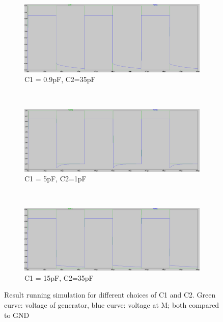 \documentclass[journal]{IEEEtran}
\begin{document}
\begin{figure}
	\begin{subfigure}[b]{\columnwidth}
		\centering
		\includegraphics[width=\textwidth]{img/sim_1.png}
		\caption{C1 = 0.9pF, C2=35pF}
	\end{subfigure} \\
	\begin{subfigure}[b]{\columnwidth}
		\centering
		\includegraphics[width=\textwidth]{img/sim_2.png}
		\caption{C1 = 5pF, C2=1pF}
	\end{subfigure} \\
	\begin{subfigure}[b]{\columnwidth}
		\centering
		\includegraphics[width=\textwidth]{img/sim_3.png}
		\caption{C1 = 15pF, C2=35pF}
	\end{subfigure}
	\caption{Result running simulation for different choices of C1 and C2. Green
	curve:
	voltage of generator, blue curve: voltage at M; both compared to GND}
	\label{fig:signal_model_result}
\end{figure}
\end{document}
